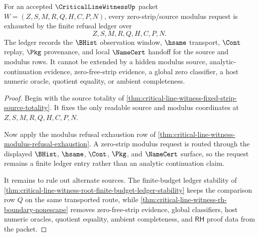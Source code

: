 \begin{theorem}
\label{thm:critical-line-witness-modulus-refusal-ledger-exhaustion}
For an accepted $\CriticalLineWitnessUp$ packet
$W=(Z,S,M,R,Q,H,C,P,N)$, every zero-strip/source modulus request is exhausted
by the finite refusal ledger over
$$
Z,S,M,R,Q,H,C,P,N.
$$
The ledger records the $\BHist$ observation window, $\hsame$ transport,
$\Cont$ replay, $\Pkg$ provenance, and local $\NameCert$ handoff for the
source and modulus rows. It cannot be extended by a hidden modulus source,
analytic-continuation evidence, zero-free-strip evidence, a global zero
classifier, a host numeric oracle, quotient equality, or ambient completeness.
\end{theorem}
\begin{proof}
Begin with the source totality of
\autoref{thm:critical-line-witness-fixed-strip-source-totality}. It fixes the
only readable source and modulus coordinates at $Z,S,M,R,Q,H,C,P,N$.

Now apply the modulus refusal exhaustion row of
\autoref{thm:critical-line-witness-modulus-refusal-exhaustion}. A
zero-strip modulus request is routed through the displayed $\BHist$,
$\hsame$, $\Cont$, $\Pkg$, and $\NameCert$ surface, so the request remains a
finite ledger entry rather than an analytic continuation claim.

It remains to rule out alternate sources. The finite-budget ledger stability
of \autoref{thm:critical-line-witness-root-finite-budget-ledger-stability}
keeps the comparison row $Q$ on the same transported route, while
\autoref{thm:critical-line-witness-rh-boundary-nonescape} removes
zero-free-strip evidence, global classifiers, host numeric oracles, quotient
equality, ambient completeness, and $\mathsf{RH}$ proof data from the packet.
\end{proof}

